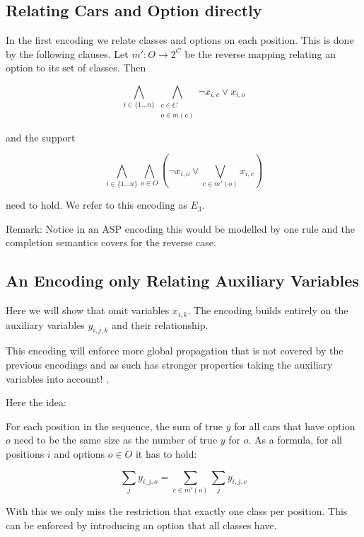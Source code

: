 \documentclass[]{llncs}
\newcommand{\TODO}[1]{ {\color{red}{#1} }}
\begin{document}
\subsection{Relating Cars and Option directly}

In the first encoding we relate classes and options on each position.
This is done by the following clauses.  Let $m':O \rightarrow 2^C$ be
the reverse mapping relating an option to its set of classes. Then

\begin{equation}
    \bigwedge_{i\in \{1\ldots n\}} \bigwedge_{\substack{c \in C \\ o \in m(c)}} \neg x_{i,c} \vee x_{i,o}
\end{equation}

and the support

\begin{equation}
    \bigwedge_{i \in \{1\dots n\}} \bigwedge_{o\in O} \left(\neg x_{i,o} \vee
    \bigvee_{c \in m'(o)} x_{i,c}\right)
\end{equation}

need to hold. We refer to this encoding as $E_3$. 

Remark: Notice in an ASP encoding this would be modelled by one rule and
the completion semantics covers for the reverse case. 

\subsection{An Encoding only Relating Auxiliary Variables}

Here we will show that omit variables $x_{i,k}$. The encoding builds
entirely on the auxiliary variables $y_{i,j,k}$ and their relationship.

This encoding will enforce more global propagation that is not covered
by the previous encodings and as such has stronger properties taking the
auxiliary variables into account! \TODO{give example which propagation
is missing}.

Here the idea: 

For each position in the sequence, the
sum of true $y$ for all cars that have option $o$ need to be the same
size as the number of true $y$ for $o$. As a formula, for all positions
$i$ and options $ o \in O$ it has to hold: 

$$ \sum_{j} y_{i,j,o} = \sum_{c \in m'(o)} \sum_j y_{i,j,c} $$

With this we only miss the restriction that exactly one class per
position. This can be enforced by introducing an option that all classes
have. 
\end{document}
